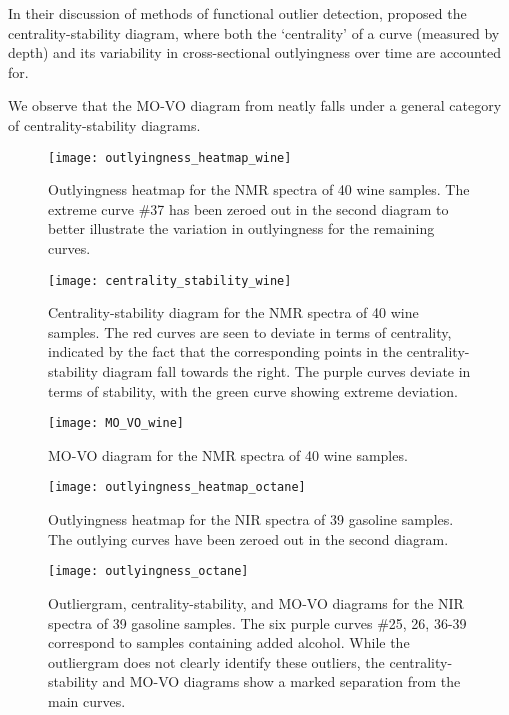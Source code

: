 In their discussion of methods of functional outlier detection,
\textcite{hubert-rousseeuw-segeart-2015} proposed the centrality-stability
diagram, where both the `centrality' of a curve (measured by depth) and its
variability in cross-sectional outlyingness over time are accounted for.

We observe that the MO-VO diagram from \textcite{dai-genton-2018} neatly falls
under a general category of centrality-stability diagrams.


\begin{figure}
    \centering
    \texttt{[image: outlyingness\_heatmap\_wine]}
    \caption{
        Outlyingness heatmap for the NMR spectra of 40 wine samples.
        The extreme curve \#37 has been zeroed out in the second diagram to
        better illustrate the variation in outlyingness for the remaining
        curves.
    }
    \label{fig:outlyingness_heatmap_wine}
\end{figure}

\begin{figure}
    \centering
    \texttt{[image: centrality\_stability\_wine]}
    \caption{
        Centrality-stability diagram for the NMR spectra of 40 wine samples.
        The red curves are seen to deviate in terms of centrality, indicated
        by the fact that the corresponding points in the centrality-stability
        diagram fall towards the right.
        The purple curves deviate in terms of stability, with the green curve
        showing extreme deviation.
    }
    \label{fig:centrality_stability_wine}
\end{figure}

\begin{figure}
    \centering
    \texttt{[image: MO\_VO\_wine]}
    \caption{
        MO-VO diagram for the NMR spectra of 40 wine samples.
    }
    \label{fig:MO_VO_wine}
\end{figure}





\begin{figure}
    \centering
    \texttt{[image: outlyingness\_heatmap\_octane]}
    \caption{
        Outlyingness heatmap for the NIR spectra of 39 gasoline samples.
        The outlying curves have been zeroed out in the second diagram.
    }
    \label{fig:outlyingness_heatmap_octane}
\end{figure}

\begin{figure}
    \centering
    \texttt{[image: outlyingness\_octane]}
    \caption{
        Outliergram, centrality-stability, and MO-VO diagrams for the NIR
        spectra of 39 gasoline samples.
        The six purple curves \#25, 26, 36-39 correspond to samples containing
        added alcohol.
        While the outliergram does not clearly identify these outliers, the
        centrality-stability and MO-VO diagrams show a marked separation from
        the main curves.
    }
    \label{fig:outlyingness_octane}
\end{figure}



